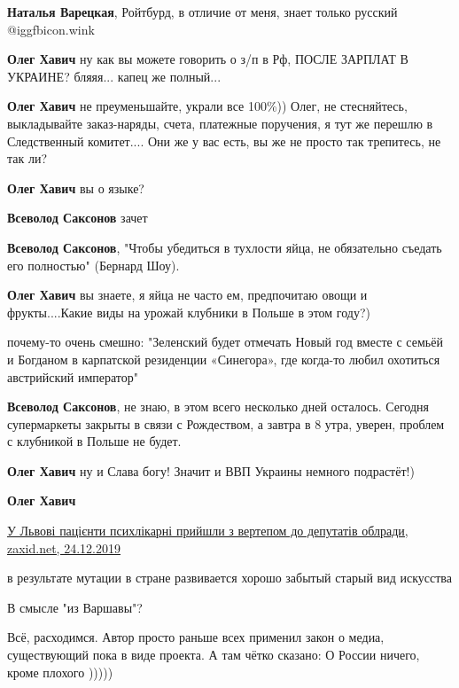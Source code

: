 \begin{itemize}
\begin{itemize}
\textbf{Наталья Варецкая}, Ройтбурд, в отличие от меня, знает только русский  @igg{fbicon.wink} 

\textbf{Олег Хавич} ну как вы можете говорить о з/п в Рф, ПОСЛЕ ЗАРПЛАТ В УКРАИНЕ? бляяя... капец же полный...

\textbf{Олег Хавич} не преуменьшайте, украли все 100\%))
Олег, не стесняйтесь, выкладывайте заказ-наряды, счета, платежные поручения, я тут же перешлю в Следственный комитет.... Они же у вас есть, вы же не просто так трепитесь,
не так ли?

\textbf{Олег Хавич} вы о языке?

\textbf{Всеволод Саксонов} зачет

\textbf{Всеволод Саксонов}, "Чтобы убедиться в тухлости яйца, не обязательно съедать его полностью" (Бернард Шоу).

\textbf{Олег Хавич} вы знаете, я яйца не часто ем, предпочитаю овощи и фрукты....Какие виды на урожай клубники в Польше в этом году?)

почему-то очень смешно:
"Зеленский будет отмечать Новый год вместе с семьёй и Богданом в карпатской резиденции «Синегора», где когда-то любил охотиться австрийский император"

\textbf{Всеволод Саксонов}, не знаю, в этом всего несколько дней осталось. Сегодня супермаркеты закрыты в связи с Рождеством, а завтра в 8 утра, уверен, проблем с клубникой в Польше не будет.

\textbf{Олег Хавич} ну и Слава богу! Значит и ВВП Украины немного подрастёт!)

\textbf{Олег Хавич}

\href{https://zaxid.net/u_lvovi_patsiyenti_psihlikarni_priyshli_z_vertepom_do_deputativ_oblradi_n1495216}{%
У Львові пацієнти психлікарні прийшли з вертепом до депутатів облради, zaxid.net, 24.12.2019%
}

в результате мутации в стране развивается хорошо забытый старый вид искусства

В смысле "из Варшавы"?

\end{itemize} %


Всё, расходимся. Автор просто раньше всех применил закон о медиа, существующий
пока в виде проекта. А там чётко сказано: О России ничего, кроме плохого )))))


\end{itemize}
